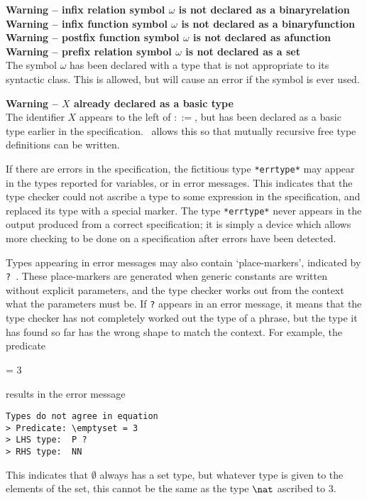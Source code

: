 {{{{{{\begin{trivlist}
\item[]
{\bf Warning -- infix relation symbol $\omega$ is not declared as a
        binary\hfil\break\hbox{}\qquad relation}\\
{\bf Warning -- infix function symbol $\omega$ is not declared as a
        binary\hfil\break\hbox{}\qquad function}\\
{\bf Warning -- postfix function symbol $\omega$ is not declared as
        a\hfil\break\hbox{}\qquad function}\\
{\bf Warning -- prefix relation symbol $\omega$ is not declared as a set}\\
        The symbol $\omega$ has been declared with a type that is
        not appropriate to its syntactic class.  This is allowed, but
        will cause an error if the symbol is ever used.

\item[]{\bf Warning -- $X$ already declared as a basic type}\\
        The identifier $X$ appears to the left of $::=$, but has
        been declared as a basic type earlier in the specification.
        \Fuzz\ allows this so that mutually recursive free type
        definitions can be written.

\end{trivlist}
\bigskip
\noindent
\def\errtype{{\tt *errtype*}}
If there are errors in the specification, the fictitious type
\verb/*errtype*/\index{\errtype} may appear in the types reported
for variables, or in error messages. This indicates that the type
checker could not ascribe 
a type to some expression in the specification, and replaced its type
with a special marker. The type \verb/*errtype*/ never appears in the
output produced from a correct specification; it is simply a device
which allows more checking to be done on a specification after errors
have been detected.

Types appearing in error messages may also contain `place-markers',
indicated by \verb/?/~. These place-markers are
generated when generic constants are written without explicit
parameters, and the type checker works out from the context what the
parameters must be.  If \verb/?/ appears in an error message, it
means that the type checker has not completely worked out the type
of a phrase, but the type it has found so far has the wrong shape to
match the context.  For example, the predicate
\begin{zed}
        \emptyset = 3
\end{zed}
results in the error message
\begin{verbatim}
Types do not agree in equation
> Predicate: \emptyset = 3
> LHS type:  P ?
> RHS type:  NN
\end{verbatim}
This indicates that $\emptyset$ always has a set type, but
whatever type is given to the elements of the set, this cannot be
the same as the type $\nat$ ascribed to $3$.

}}}}}}
